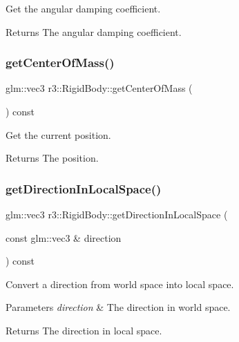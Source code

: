 Get the angular damping coefficient. 

\begin{DoxyReturn}{Returns}
The angular damping coefficient. 
\end{DoxyReturn}
\mbox{\label{classr3_1_1_rigid_body_a9b802fe5774292fbc6ce80cccab15151}} 
\subsubsection{\texorpdfstring{get\+Center\+Of\+Mass()}{getCenterOfMass()}}
{\footnotesize\ttfamily glm\+::vec3 r3\+::\+Rigid\+Body\+::get\+Center\+Of\+Mass (\begin{DoxyParamCaption}{ }\end{DoxyParamCaption}) const}



Get the current position. 

\begin{DoxyReturn}{Returns}
The position. 
\end{DoxyReturn}
\mbox{\label{classr3_1_1_rigid_body_a621796b0cd49499e10b158096ae5c938}} 
\subsubsection{\texorpdfstring{get\+Direction\+In\+Local\+Space()}{getDirectionInLocalSpace()}}
{\footnotesize\ttfamily glm\+::vec3 r3\+::\+Rigid\+Body\+::get\+Direction\+In\+Local\+Space (\begin{DoxyParamCaption}\item[{const glm\+::vec3 \&}]{direction }\end{DoxyParamCaption}) const}



Convert a direction from world space into local space. 


\begin{DoxyParams}{Parameters}
{\em direction} & The direction in world space. \\
\hline
\end{DoxyParams}
\begin{DoxyReturn}{Returns}
The direction in local space. 
\end{DoxyReturn}
\mbox{\label{classr3_1_1_rigid_body_aa51f55f7c344d1d7754b91b565cb6eac}} 
